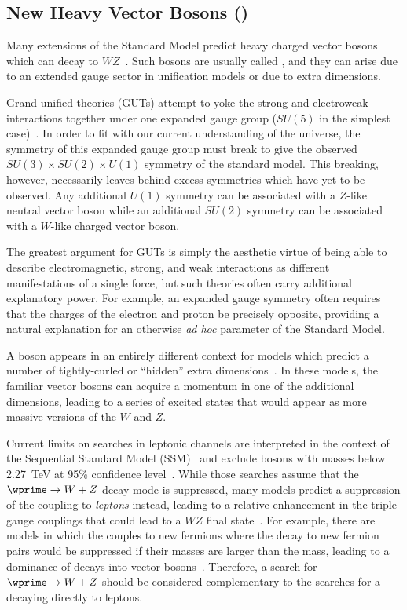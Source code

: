 \subsection{New Heavy Vector Bosons (\wprime)}
\label{sec:wprime}

Many extensions of the Standard Model predict heavy charged vector bosons which can decay to $WZ$~\cite{Salam:1974,Altarelli:1989,Perelstein:2007}.  Such bosons are usually called \wprime, and they can arise due to an extended gauge sector in unification models or due to extra dimensions.

Grand unified theories (GUTs) attempt to yoke the strong and electroweak interactions together under one expanded gauge group ($SU(5)$ in the simplest case)~\cite{Georgi:1974sy}.  In order to fit with our current understanding of the universe, the symmetry of this expanded gauge group must break to give the observed $SU(3) \times SU(2) \times U(1)$ symmetry of the standard model.  This breaking, however, necessarily leaves behind excess symmetries which have yet to be observed.  Any additional $U(1)$ symmetry can be associated with a $Z$-like neutral vector boson while an additional $SU(2)$ symmetry can be associated with a $W$-like charged vector boson.

The greatest argument for GUTs is simply the aesthetic virtue of being able to describe electromagnetic, strong, and weak interactions as different manifestations of a single force, but such theories often carry additional explanatory power.  For example, an expanded gauge symmetry often requires that the charges of the electron and proton be precisely opposite, providing a natural explanation for an otherwise \emph{ad hoc} parameter of the Standard Model.

A \wprime{} boson appears in an entirely different context for models which predict a number of tightly-curled or ``hidden'' extra dimensions~\cite{Klein:1926}.  In these models, the familiar vector bosons can acquire a momentum in one of the additional dimensions, leading to a series of excited states that would appear as more massive versions of the $W$ and $Z$.

Current limits on \wprime searches in leptonic channels are interpreted in the context of the Sequential Standard Model (SSM)~\cite{Salam:1974,Altarelli:1989,Perelstein:2007} and exclude \wprime bosons with masses below \SI{2.27}{\TeV} at 95\% confidence level~\cite{CMS-PAS-EXO-11-024}. While those searches assume that the $\wprime \to W + Z$ decay mode is suppressed, many \wprime models predict a suppression of the coupling to \emph{leptons} instead, leading to a relative enhancement in the triple gauge couplings that could lead to a $WZ$ final state~\cite{Wprimereview}.  For example, there are models in which the \wprime{} couples to new fermions where the decay to new fermion pairs would be suppressed if their masses are larger than the \wprime mass, leading to a dominance of decays into vector bosons~\cite{WprimeWZ}. Therefore, a search for $\wprime \to W + Z$ should be considered complementary to the searches for a \wprime{} decaying directly to leptons.
